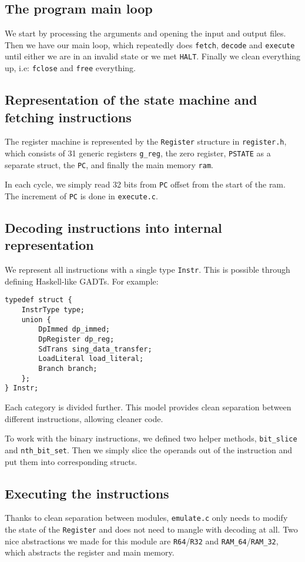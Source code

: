 \documentclass[11pt]{article}
\begin{document}
\subsection{The program main loop}
We start by processing the arguments and opening the input and output files.
Then we have our main loop, which repeatedly does \texttt{fetch},
\texttt{decode} and \texttt{execute} until either we are in an invalid state or
we met \texttt{HALT}. Finally we clean everything up, i.e: \texttt{fclose} and
\texttt{free} everything.

\subsection{Representation of the state machine and fetching instructions}

The register machine is represented by the \texttt{Register} structure in
\texttt{register.h}, which consists of 31 generic registers \texttt{g\_reg},
the zero register, \texttt{PSTATE} as a separate struct, the \texttt{PC}, and
finally the main memory \texttt{ram}.

In each cycle, we simply read 32 bits from \texttt{PC} offset from the start of
the ram. The increment of \texttt{PC} is done in \texttt{execute.c}.

\subsection{Decoding instructions into internal representation}

We represent all instructions with a single type \texttt{Instr}. This is
possible through defining Haskell-like GADTs. For example:

\begin{verbatim}
typedef struct {
    InstrType type;
    union {
        DpImmed dp_immed;
        DpRegister dp_reg;
        SdTrans sing_data_transfer;
        LoadLiteral load_literal;
        Branch branch;
    };
} Instr;
\end{verbatim}

Each category is divided further. This model provides clean separation between
different instructions, allowing cleaner code.

To work with the binary instructions, we defined two helper methods,
\texttt{bit\_slice} and \texttt{nth\_bit\_set}. Then we simply slice the
operands out of the instruction and put them into corresponding structs.

\subsection{Executing the instructions}
Thanks to clean separation between modules, \texttt{emulate.c} only needs to
modify the state of the \texttt{Register} and does not need to mangle with
decoding at all. Two nice abstractions we made for this module are
\texttt{R64}/\texttt{R32} and \texttt{RAM\_64}/\texttt{RAM\_32}, which
abstracts the register and main memory.
\end{document}
